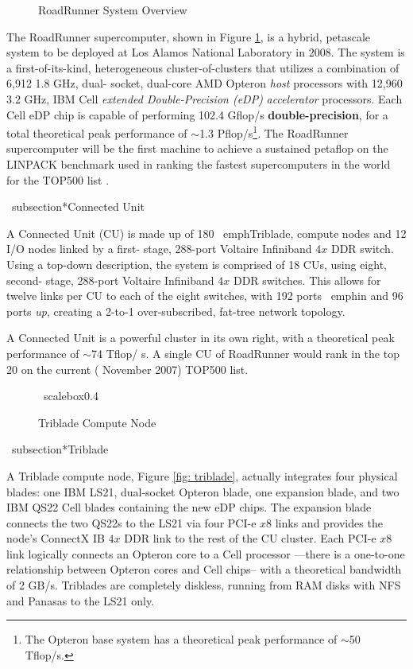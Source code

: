 \documentclass[letter,10pt]{article}
\begin{document}
\begin{figure}
    \begin{center}
    \scalebox{0.3}{}
    \caption{RoadRunner System Overview}
    \label{fig:system}
    \end{center}
\end{figure}

The RoadRunner supercomputer, shown in Figure \ref{fig:system}, is a 
hybrid, petascale system to be deployed at Los Alamos National 
Laboratory in 2008.  The system is a first-of-its-kind, heterogeneous 
cluster-of-clusters that utilizes a combination of 6,912 1.8 GHz, dual-
socket, dual-core AMD Opteron \emph{host} processors with 12,960 3.2 
GHz, IBM Cell \emph{extended Double-Precision (eDP)} \emph{
accelerator} processors.  Each Cell eDP chip is capable of performing 
102.4 Gflop/s \textbf{double-precision}, for a total theoretical peak 
performance of $\sim$1.3 Pflop/s\footnote{The Opteron base system has 
a theoretical peak performance of $\sim$50 Tflop/s.}.  The RoadRunner 
supercomputer will be the first machine to achieve a sustained 
petaflop on the LINPACK benchmark used in ranking the fastest 
supercomputers in the world for the TOP500 list \cite{top500}.

\
subsection*{Connected Unit}

A Connected Unit (CU) is made up of 180 \
emph{Triblade}, compute nodes and 12 I/O nodes linked by a first-
stage, 288-port Voltaire Infiniband $4x$ DDR switch.  Using a top-down 
description, the system is comprised of 18 CUs, using eight, second-
stage, 288-port Voltaire Infiniband $4x$ DDR switches.  This allows 
for twelve links per CU to each of the eight switches, with 192 ports \
emph{in} and 96 ports \emph{up}, creating a 2-to-1 over-subscribed, 
fat-tree network topology.

A Connected Unit is a powerful cluster in 
its own right, with a theoretical peak performance of $\sim$74 Tflop/
s.  A single CU of RoadRunner would rank in the top 20 on the current (
November 2007) TOP500 list.

\begin{figure}
    \begin{center}
    \
scalebox{0.4}{}
    \caption{Triblade Compute 
Node}
    \label{fig:triblade}
    \end{center}
\end{figure}

\
subsection*{Triblade}

A Triblade compute node, Figure \ref{fig:
triblade}, actually integrates four physical blades: one IBM LS21, 
dual-socket Opteron blade, one expansion blade, and two IBM QS22 Cell 
blades containing the new eDP chips.  The expansion blade connects the 
two QS22s to the LS21 via four PCI-e $x8$ links and provides the 
node's ConnectX IB $4x$ DDR link to the rest of the CU cluster.  Each 
PCI-e $x8$ link logically connects an Opteron core to a Cell 
processor ---there is a one-to-one relationship between Opteron cores 
and Cell chips-- with a theoretical bandwidth of 2 GB/s.  Triblades 
are completely diskless, running from RAM disks with NFS and Panasas 
\cite{panasas} to the LS21 only.
\end{document}
